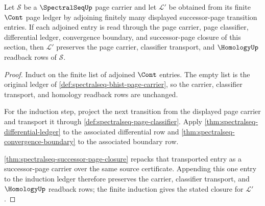 \begin{theorem}
\label{thm:spectralseq-cont-page-ledger-closure}
Let $\mathcal S$ be a $\SpectralSeqUp$ page carrier and let $\mathcal L'$ be
obtained from its finite $\Cont$ page ledger by adjoining finitely many
displayed successor-page transition entries. If each adjoined entry is read
through the page carrier, page classifier, differential ledger, convergence
boundary, and successor-page closure of this section, then $\mathcal L'$
preserves the page carrier, classifier transport, and $\HomologyUp$ readback
rows of $\mathcal S$.
\end{theorem}
\begin{proof}
Induct on the finite list of adjoined $\Cont$ entries. The empty list is the
original ledger of \autoref{def:spectralseq-bhist-page-carrier}, so the carrier,
classifier transport, and homology readback rows are unchanged.

For the induction step, project the next transition from the displayed page
carrier and transport it through \autoref{def:spectralseq-page-classifier}.
Apply \autoref{thm:spectralseq-differential-ledger} to the associated
differential row and \autoref{thm:spectralseq-convergence-boundary} to the
associated boundary row.

\autoref{thm:spectralseq-successor-page-closure} repacks that transported
entry as a successor-page carrier over the same source certificate. Appending
this one entry to the induction ledger therefore preserves the carrier,
classifier transport, and $\HomologyUp$ readback rows; the finite induction
gives the stated closure for $\mathcal L'$.
\end{proof}

